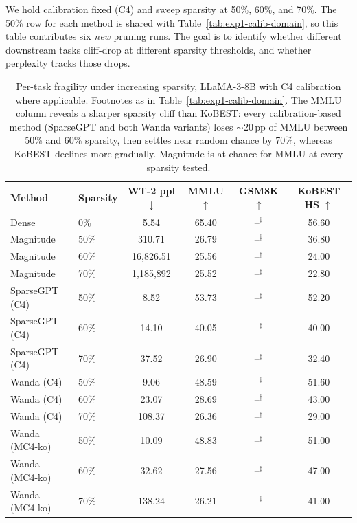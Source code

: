 \documentclass{article}
\begin{document}
We hold calibration fixed (C4) and sweep sparsity at 50\%, 60\%, and 70\%.
The 50\% row for each method is shared with Table~\ref{tab:exp1-calib-domain},
so this table contributes six \emph{new} pruning runs.
The goal is to identify whether different downstream tasks cliff-drop at
different sparsity thresholds, and whether perplexity tracks those drops.

\begin{table}[h]
  \caption{Per-task fragility under increasing sparsity, LLaMA-3-8B with
           C4 calibration where applicable. Footnotes as in
           Table~\ref{tab:exp1-calib-domain}. The MMLU column reveals
           a sharper sparsity cliff than KoBEST: every calibration-based
           method (SparseGPT and both Wanda variants) loses $\sim$20\,pp
           of MMLU between 50\% and 60\% sparsity, then settles near
           random chance by 70\%, whereas KoBEST declines more gradually.
           Magnitude is at chance for MMLU at every sparsity tested.}
  \label{tab:exp2-sparsity-curves}
  \centering
  \small
  \begin{tabular}{llcccc}
    \toprule
    Method & Sparsity & WT-2 ppl $\downarrow$ & MMLU $\uparrow$ & GSM8K $\uparrow$ & KoBEST HS $\uparrow$ \\
    \midrule
    Dense                & 0\%   & 5.54        & 65.40        & --$^\ddagger$ & 56.60 \\
    \midrule
    Magnitude            & 50\%  & 310.71      & 26.79        & --$^\ddagger$ & 36.80 \\
    Magnitude            & 60\%  & 16{,}826.51 & 25.56        & --$^\ddagger$ & 24.00 \\
    Magnitude            & 70\%  & 1{,}185{,}892 & 25.52      & --$^\ddagger$ & 22.80 \\
    \midrule
    SparseGPT (C4)       & 50\%  & 8.52        & 53.73        & --$^\ddagger$ & 52.20 \\
    SparseGPT (C4)       & 60\%  & 14.10       & 40.05        & --$^\ddagger$ & 40.00 \\
    SparseGPT (C4)       & 70\%  & 37.52       & 26.90        & --$^\ddagger$ & 32.40 \\
    \midrule
    Wanda (C4)           & 50\%  & 9.06        & 48.59        & --$^\ddagger$ & 51.60 \\
    Wanda (C4)           & 60\%  & 23.07       & 28.69        & --$^\ddagger$ & 43.00 \\
    Wanda (C4)           & 70\%  & 108.37      & 26.36        & --$^\ddagger$ & 29.00 \\
    \midrule
    Wanda (MC4-ko)       & 50\%  & 10.09       & 48.83        & --$^\ddagger$ & 51.00 \\
    Wanda (MC4-ko)       & 60\%  & 32.62       & 27.56        & --$^\ddagger$ & 47.00 \\
    Wanda (MC4-ko)       & 70\%  & 138.24      & 26.21        & --$^\ddagger$ & 41.00 \\
    \bottomrule
  \end{tabular}
\end{table}
\end{document}
